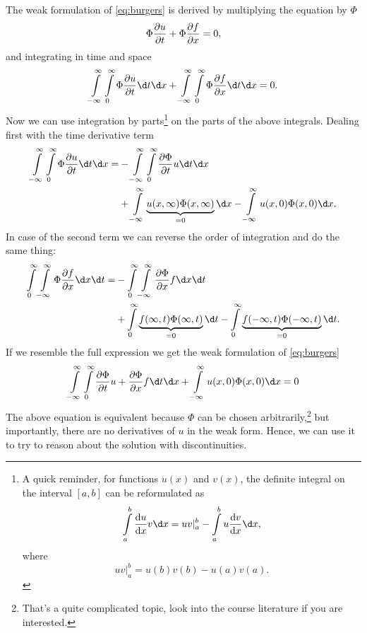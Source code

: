 \documentclass[justified, nobib, a4page]{tufte-handout}
\begin{document}
The weak formulation of \cref{eq:burgers} is derived by multiplying the equation by 
\(\Phi\)
\[
  \Phi\pdv{u}{t} + \Phi\pdv{f}{x} = 0,
\]
and integrating in time and space
\[
  \int\limits_{-\infty}^{\infty} \int\limits_{0}^{\infty} \Phi\pdv{u}{t} \d t \d x 
  + \int\limits_{-\infty}^{\infty} \int\limits_{0}^{\infty} \Phi\pdv{f}{x}  \d t \d x= 0.
\]
Now we can use integration by parts\footnote{%
  A quick reminder, for functions \(u(x)\) and \(v(x)\), the definite integral on the 
  interval \([a,b]\) can be reformulated as 
  \[
    \int\limits_a^b \odv{u}{x} v \d x = 
    uv|_a^b
    - \int\limits_a^b u\odv{v}{x}  \d x ,
  \]
  where
  \[
    uv|_a^b = u(b)v(b) - u(a)v(a).
  \]
  }
on the parts of the above integrals. Dealing first with the time derivative term
\begin{equation*}
  \begin{split}
    \int\limits_{-\infty}^{\infty} \int\limits_{0}^{\infty} \Phi\pdv{u}{t} \d t \d x 
    = &-\int\limits_{-\infty}^{\infty} \int\limits_{0}^{\infty} \pdv{\Phi}{t}u \d t \d x \\
    &+ \int\limits_{-\infty}^{\infty} \underbrace{u(x, \infty)\Phi(x, \infty)}_{=0} \d x
    - \int\limits_{-\infty}^{\infty} u(x, 0)\Phi(x, 0) \d x.
  \end{split}
\end{equation*}
In case of the second term we can reverse the order of integration and do the same thing:
\begin{equation*}
  \begin{split}
     \int\limits_{0}^{\infty} \int\limits_{-\infty}^{\infty} \Phi\pdv{f}{x}  \d x \d t
    = &-\int\limits_{0}^{\infty} \int\limits_{-\infty}^{\infty} \pdv{\Phi}{x}f \d x \d t \\
    &+ \int\limits_{0}^{\infty} \underbrace{f(\infty, t)\Phi(\infty, t)}_{=0} \d t
    - \int\limits_{0}^{\infty} \underbrace{f(-\infty, t)\Phi(-\infty, t)}_{=0} \d t.
  \end{split}
\end{equation*}
If we resemble the full expression we get the weak formulation of \cref{eq:burgers}
\[
    \int\limits_{-\infty}^{\infty} \int\limits_{0}^{\infty} \pdv{\Phi}{t}u + \pdv{\Phi}{x}f \d t \d x
  + \int\limits_{-\infty}^{\infty} u(x, 0)\Phi(x, 0) \d x
  = 0
\]
The above equation is equivalent because \(\Phi\) can be chosen arbitrarily,\footnote{%
  That's a quite complicated topic, look into the course literature if you are
  interested.}
but importantly, there are no derivatives of \(u\) in the weak form. Hence, we can 
use it to try to reason about the solution with discontinuities.
\end{document}

